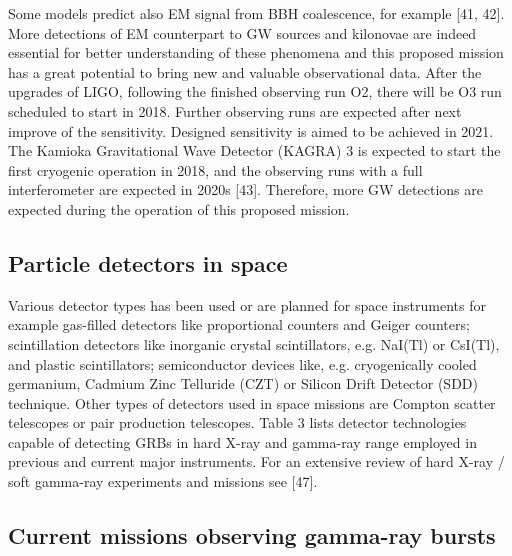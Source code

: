 \documentclass[12pt, a4paper,titlepage]{article}
\numberwithin{equation}{section}
\numberwithin{figure}{section}
\begin{document}
Some models predict also EM signal from BBH coalescence, for example [41, 42]. More detections of EM counterpart to GW sources and kilonovae are indeed essential for better understanding of these phenomena and this proposed mission has a great potential to bring new and valuable observational data.
After the upgrades of LIGO, following the finished observing run O2, there will be O3 run scheduled to start in 2018. Further observing runs are expected after next improve of the sensitivity. Designed sensitivity is aimed to be achieved in 2021. The Kamioka Gravitational Wave Detector (KAGRA) 3 is expected to start the first cryogenic operation in 2018, and the observing runs with a full interferometer are expected in 2020s [43]. Therefore, more GW detections are expected during the operation of this proposed mission.

\subsection{Particle detectors in space}

Various detector types has been used or are planned for space instruments for example gas-filled detectors like proportional counters and Geiger counters; scintillation detectors like inorganic crystal scintillators, e.g. NaI(Tl) or CsI(Tl), and plastic scintillators; semiconductor devices like, e.g. cryogenically cooled germanium, Cadmium Zinc Telluride (CZT) or Silicon Drift Detector (SDD) technique. Other types of detectors used in space missions are Compton scatter telescopes or pair production telescopes. Table 3 lists detector technologies capable of detecting GRBs in hard X-ray and gamma-ray range employed in previous and current major instruments. For an extensive review of hard X-ray / soft gamma-ray experiments and missions see [47].

\subsection{Current missions observing gamma-ray bursts}
\end{document}
